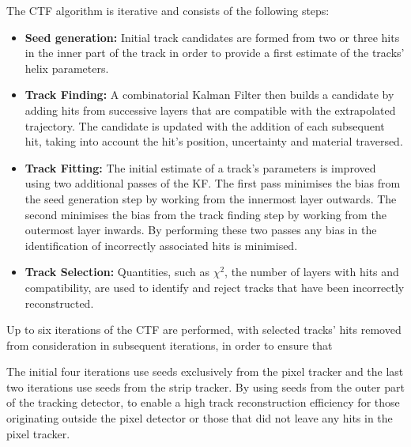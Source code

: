 The CTF algorithm is iterative and consists of the following steps:
\begin{itemize}
\item \textbf{Seed generation:} Initial track candidates are formed from two or three hits in the inner part of the track in order to provide a first estimate of the tracks' helix parameters.
\item \textbf{Track Finding:} A combinatorial Kalman Filter then builds a candidate by adding hits from successive layers that are compatible with the extrapolated trajectory. The candidate is updated with the addition of each subsequent hit, taking into account the hit's position, uncertainty and material traversed.
\item \textbf{Track Fitting:} The initial estimate of a track's parameters is improved using two additional passes of the KF.
The first pass minimises the bias from the seed generation step by working from the innermost layer outwards.
The second minimises the bias from the track finding step by working from the outermost layer inwards.
By performing these two passes any bias in the identification of incorrectly associated hits is minimised.
\item \textbf{Track Selection:} Quantities, such as $\chi^{2}$, the number of layers with hits and compatibility, are used to identify and reject tracks that have been incorrectly reconstructed.
\end{itemize}

Up to six iterations of the CTF are performed, with selected tracks' hits removed from consideration in subsequent iterations, in order to ensure that 

The initial four iterations use seeds exclusively from the pixel tracker and the last two iterations use seeds from the strip tracker.
By using seeds from the outer part of the tracking detector, to enable a high track reconstruction efficiency for those originating outside the pixel detector or those that did not leave any hits in the pixel tracker.

